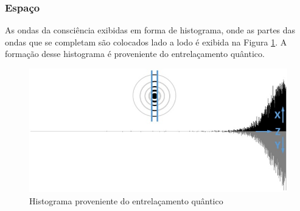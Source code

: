 \subsubsection{Espaço}
As ondas da consciência exibidas em forma de histograma, onde as partes das ondas que se completam são colocados lado a lodo é exibida na Figura \ref{fig:consciousness_space_waves}. A formação desse histograma é proveniente do entrelaçamento quântico.
	\begin{figure}[H]
	\caption{Histograma proveniente do entrelaçamento quântico}
	\label{fig:consciousness_space_waves}
	\centering
	\includegraphics[scale=.7]{sections/images/consciousness_space_waves.jpg}
	\end{figure}

